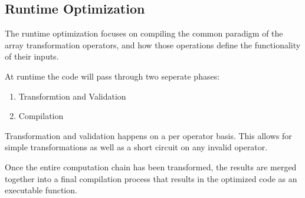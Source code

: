 \subsection{Runtime Optimization}
The runtime optimization focuses on compiling the common paradigm of the array transformation operators, and how those operations define the functionality of their inputs.

At runtime the code will pass through two seperate phases:

\begin{enumerate}
  \item Transformtion and Validation
  \item Compilation
\end{enumerate}

Transformation and validation happens on a per operator basis.  This allows for simple transformations as well as a short circuit on any invalid operator.

Once the entire computation chain has been transformed, the results are merged together into a final compilation process that results in the optimized code as an executable function. 

\begin{minipage}{\linewidth}

\end{minipage}


